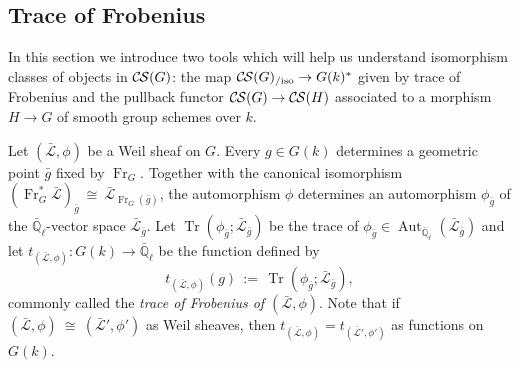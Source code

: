 \documentclass[10pt]{amsart}
\theoremstyle{plain}
\theoremstyle{definition}
\newcommand{\EE}{\mathbb{\bar Q}_\ell}
\newcommand{\bFq}{\bar{k}}
\newcommand{\Fq}{k}
\newcommand{\Frob}[1]{\operatorname{Fr}_{#1}}
\DeclareMathOperator{\Aut}{Aut}
\DeclareMathOperator{\Hom}{Hom}
\DeclareMathOperator{\trace}{Tr}
\newcommand{\ceq}{{\, :=\, }}
\newcommand{\iso}{{\ \cong\ }}
\newcommand{\trFrob}[1]{t_{#1}}
\newcommand{\cs}[1]{{\mathcal{#1}}}
\newcommand{\gcs}[1]{{\mathcal{\bar #1}}}
\newcommand{\CS}{{\mathcal{C\hskip-0.8pt S}}}
\newcommand{\CSiso}[1]{\CS(#1)_{/\text{iso}}}
\newcommand{\bg}{{\bar{g}}}
\newcommand{\brho}{{\bar\rho}}
\begin{document}
\iffalse
\begin{proof}
Suppose $\rho \in \Hom(\cs{L},\cs{L}')$.
We prove the lemma by considering the linear transformations $\brho_{\bg} : \gcs{L}_{\bg} \to \gcs{L}_{\bg}$ at the stalks
above geometric points $\bg$ on $G$ and showing that, either each $\brho_{\bg}$ trivial or each $\brho_{\bg}$ is an isomorphism.
(This idea is expanded upon in Section~\ref{ssec:stalks}.)
Let ${\bar e}$ be the geometric point above the identity $e$ for $G$ determined by our choice of algebraic closure $\bFq$ of $\Fq$.
If $\brho_{\bar e} = 0$ then the second diagram in \ref{CS.4} implies that $\brho_{\bg} = 0$ for all $\bg$, in which case $\rho$ is trivial.
On the other hand, if $\brho_{\bar e}$ is non-trivial then the second diagram in \ref{CS.4} implies that $\brho_{\bg}$ is non-trivial
for all $\bg$ and thus an isomorphism, since the stalks of character sheaves are one-dimensional; in this case $\rho$ is an isomorphism.
\end{proof}
\fi

\subsection{Trace of Frobenius}\label{ssec:Frob}

In this section we introduce two tools which will help us understand isomorphism classes of objects in $\CS(G)$:
the map $\CSiso{G} \to G(k)^*$ given by trace of Frobenius and the pullback functor $\CS(G) \to \CS(H)$
associated to a morphism $H \to G$ of smooth group schemes over $\Fq$.

Let $(\gcs{L},\phi)$ be a Weil sheaf on $G$. Every $g\in G(\Fq)$
determines a geometric point $\bg$ fixed by $\Frob{G}$. 
Together with the canonical isomorphism $(\Frob{G}^*\gcs{L})_{\bg} \iso  \gcs{L}_{\Frob{G}(\bg)}$,
the automorphism $\phi$ determines an automorphism $\phi_{\bg}$ of the $\EE$-vector space $\gcs{L}_{\bg}$.
Let $\trace(\phi_{\bg};\gcs{L}_{\bg})$ be the trace of $\phi_{\bg} \in \Aut_{\EE}(\gcs{L}_{\bg})$ and let
$\trFrob{(\gcs{L},\phi)} : G(\Fq)\to \EE$ be the function defined by 
\begin{equation}\label{trWeil}
\trFrob{(\gcs{L},\phi)}(g) \ceq \trace(\phi_{\bg};\gcs{L}_{\bg}),
\end{equation}
commonly called the {\em trace of Frobenius of $(\gcs{L},\phi)$}.
Note that if $(\gcs{L},\phi) \iso (\gcs{L'},\phi')$ as Weil sheaves, 
then $\trFrob{(\gcs{L},\phi)} = \trFrob{(\gcs{L'},\phi')}$ as functions on $G(\Fq)$.
\end{document}

